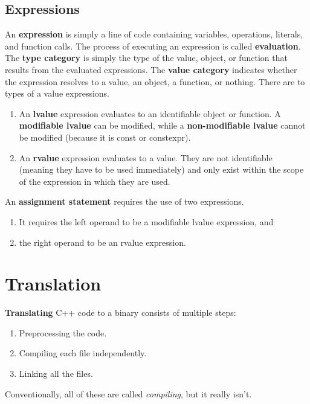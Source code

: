 \documentclass{article}
\begin{document}
  \subsection{Expressions}

    \begin{definition}[Expression]
      An \textbf{expression} is simply a line of code containing variables, operations, literals, and function calls. The process of executing an expression is called \textbf{evaluation}. The \textbf{type category} is simply the type of the value, object, or function that results from the evaluated expressions. The \textbf{value category} indicates whether the expression resolves to a value, an object, a function, or nothing. There are to types of a value expressions. 
      \begin{enumerate}
        \item An \textbf{lvalue} expression evaluates to an identifiable object or function. A \textbf{modifiable lvalue} can be modified, while a \textbf{non-modifiable lvalue} cannot be modified (because it is const or constexpr). 
        \item An \textbf{rvalue} expression evaluates to a value. They are not identifiable (meaning they have to be used immediately) and only exist within the scope of the expression in which they are used. 
      \end{enumerate}
    \end{definition}

    \begin{example}
      An \textbf{assignment statement} requires the use of two expressions. 
      \begin{enumerate}
        \item It requires the left operand to be a modifiable lvalue expression, and
        \item the right operand to be an rvalue expression. 
      \end{enumerate}
    \end{example}

\section{Translation} 

    \textbf{Translating} C++ code to a binary consists of multiple steps: 
    \begin{enumerate}
      \item Preprocessing the code. 
      \item Compiling each file independently. 
      \item Linking all the files. 
    \end{enumerate}
    Conventionally, all of these are called \textit{compiling}, but it really isn't. 
\end{document}
